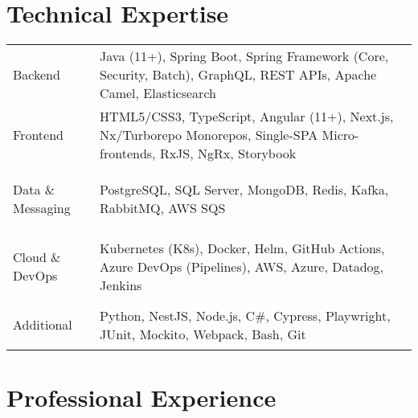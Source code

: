

\section*{Technical Expertise}
{ %
    \renewcommand{\arraystretch}{\skillsRowHeightScale}
    \begin{tabularx}{\textwidth}
    {@{} >{\bfseries\scshape\raggedright}p{\skillsLabelWidth} @{\hspace{\skillsLabelValueGap}} X @{}}
        Backend & \small
        Java (11+), Spring Boot, Spring Framework (Core, Security, Batch), GraphQL, REST APIs, Apache Camel,
        Elasticsearch \\
        Frontend & \small
        HTML5/CSS3, TypeScript, Angular (11+), Next.js, Nx/Turborepo Monorepos, Single-SPA Micro-frontends, RxJS, NgRx,
        Storybook \\
        Data \& Messaging & \small PostgreSQL, SQL Server, MongoDB, Redis, Kafka, RabbitMQ, AWS SQS \\
        Cloud \& DevOps & \small
        Kubernetes (K8s), Docker, Helm, GitHub Actions, Azure DevOps (Pipelines), AWS, Azure, Datadog, Jenkins \\
        Additional & \small Python, NestJS, Node.js, C\#, Cypress, Playwright, JUnit, Mockito, Webpack, Bash, Git \\
    \end{tabularx}
} %
\vspace{\skillsTableBottomMargin}



\section*{Professional Experience}

